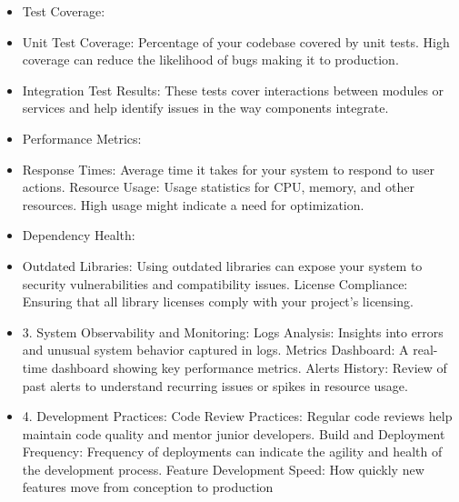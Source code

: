 \documentclass[12pt, a4paper, oneside]{book}
\begin{document}
\begin{itemize}
\item Test Coverage:
\item Unit Test Coverage: Percentage of your codebase covered by unit tests. High coverage can reduce the likelihood of bugs making it to production.
\item Integration Test Results: These tests cover interactions between modules or services and help identify issues in the way components integrate.
\item Performance Metrics:
\item Response Times: Average time it takes for your system to respond to user actions.
Resource Usage: Usage statistics for CPU, memory, and other resources. High usage might indicate a need for optimization.
\item Dependency Health:
\item Outdated Libraries: Using outdated libraries can expose your system to security vulnerabilities and compatibility issues.
License Compliance: Ensuring that all library licenses comply with your project's licensing.
\item 3. System Observability and Monitoring:
Logs Analysis: Insights into errors and unusual system behavior captured in logs.
Metrics Dashboard: A real-time dashboard showing key performance metrics.
Alerts History: Review of past alerts to understand recurring issues or spikes in resource usage.
\item 4. Development Practices:
Code Review Practices: Regular code reviews help maintain code quality and mentor junior developers.
Build and Deployment Frequency: Frequency of deployments can indicate the agility and health of the development process.
Feature Development Speed: How quickly new features move from conception to production
\end{itemize}
\end{document}
